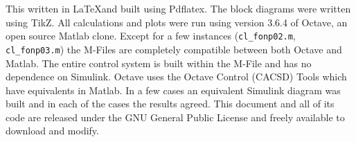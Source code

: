 \documentclass{article}
\begin{document}
This written in \LaTeX and built using Pdflatex.
The block diagrams were written using TikZ\autocite{tikz}.
All calculations and plots were run using version 3.6.4 of
Octave\autocite{octave}, an open source Matlab clone.
Except for a few instances (\verb+cl_fonp02.m+, \verb+cl_fonp03.m+) the
M-Files are completely compatible between both Octave and Matlab.
The entire control system is built within the M-File and has
no dependence on Simulink.
Octave uses the Octave Control (CACSD) Tools\autocite{octave-control} 
which have equivalents in Matlab.
In a few cases an equivalent Simulink diagram was built and in
each of the cases the results agreed.
This document and all of its code are released under the
GNU General Public License and freely
available to download and modify\autocite{github_jmahler_idle-control}.
\nocite{github_jmahler_control}


\clearpage
\printbibliography[heading=bibintoc]
\end{document}
